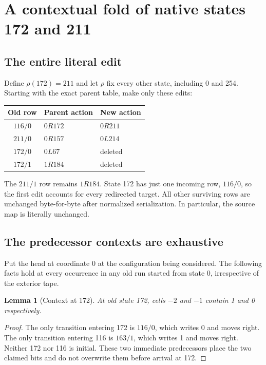 \documentclass[11pt,letterpaper]{article}
\newtheorem{lemma}[theorem]{Lemma}
\begin{document}
\section{A contextual fold of native states 172 and 211}
\subsection{The entire literal edit}
Define $\rho(172)=211$ and let $\rho$ fix every other state, including
0 and 254. Starting with the exact parent table, make only these edits:
\begin{center}
\begin{tabular}{cll}\toprule
Old row & Parent action & New action\\\midrule
$116/0$ & $0R172$ & $0R211$\\
$211/0$ & $0R157$ & $0L214$\\
$172/0$ & $0L67$ & deleted\\
$172/1$ & $1R184$ & deleted\\\bottomrule
\end{tabular}
\end{center}
The $211/1$ row remains $1R184$. State 172 has just one incoming row,
$116/0$, so the first edit accounts for every redirected target. All other
surviving rows are unchanged byte-for-byte after normalized serialization.
In particular, the source map is literally unchanged.

\subsection{The predecessor contexts are exhaustive}
Put the head at coordinate 0 at the configuration being considered.
The following facts hold at every occurrence in any old run started
from state 0, irrespective of the exterior tape.

\begin{lemma}[Context at 172]\label{lem:172}
At old state 172, cells $-2$ and $-1$ contain 1 and 0 respectively.
\end{lemma}
\begin{proof}
The only transition entering 172 is $116/0$, which writes 0 and moves
right. The only transition entering 116 is $163/1$, which writes 1
and moves right. Neither 172 nor 116 is initial. These two immediate
predecessors place the two claimed bits and do not overwrite them
before arrival at 172.
\end{proof}
\end{document}
